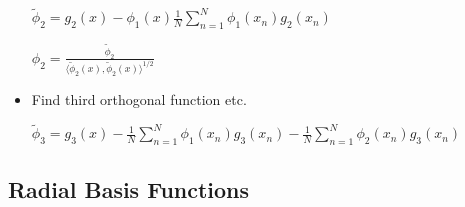 \documentclass[8pt,a4paper]{scrartcl}
\begin{document}
\begin{multicols*}{3}
\begin{itemize}
$\tilde \phi_2 = g_2(x) - \phi_1(x) \frac{1}{N} \sum_{n=1}^N \phi_1(x_n) g_2(x_n)$


$\phi_2 = \frac{\tilde \phi_2}{\langle \tilde \phi_2(x) , \tilde \phi_2(x) \rangle^{1/2}} $

\item Find third orthogonal function etc.

\small
$\tilde \phi_3 = g_3(x) -  $$ \frac{1}{N} \sum\limits_{n=1}^N \phi_1(x_n) g_3(x_n) - $$\frac{1}{N} \sum\limits_{n=1}^N \phi_2(x_n) g_3(x_n)$\normalsize

\end{itemize}


\subsection{Radial Basis Functions}


\end{multicols*}
\end{document}
